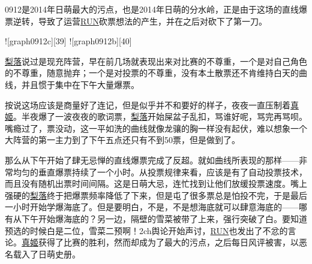 
0912是2014年日萌最大的污点，也是2014年日萌的分水岭，正是由于这场的直线爆票逆转，导致了运营\uline{RUN}砍票想法的产生，并在之后对砍下了第一刀。

![graph0912c][39]
![graph0912b][40]

\uline{梨落}说过是现充阵营，早在前几场就表现出来对比赛的不尊重，一个是对自己角色的不尊重，随意抛弃；一个是对投票的不尊重，没有本土散票还不肯维持白天的曲线，并且惯于集中在下午大量爆票。

按说这场应该是商量好了连记，但是似乎并不和要好的样子，夜夜一直压制着\uline{真姬}。半夜爆了一波夜夜的歌词票，\uline{梨落}开始屎盆子乱扣，骂谁好呢，骂完再骂呗。嘴瘾过了，票没动，这一平如洗的曲线就像龙骧的胸一样没有起伏，难以想象一个大阵营的第一主力到了下午五点还只有不到50票，但是做到了。

那么从下午开始了肆无忌惮的直线爆票完成了反超。就如曲线所表现的那样——非常均匀的垂直爆票持续了一个小时。从投票规律来看，应该是有了自动投票技术，而且没有随机出票时间间隔。这是日萌大忌，连忙找到让他们放缓投票速度。嘴上强硬的\uline{梨落}终于把爆票频率降低了下来，但是屯了很多票总是怕投不完，于是最后一小时开始学爆海底了。但是要明白，不是，不是想海底就可以肆意海底的——哪有从下午开始爆海底的？另一边，隔壁的雪菜被带了上来，强行突破了白。要知道预选的时候白是二位，雪菜二预啊！2ch舆论开始声讨，\uline{RUN}也发出了不忿的言论。\uline{真姬}获得了比赛的胜利，然而却成为了最大的污点，之后每日风评被害，以恶名载入了日萌史册。

